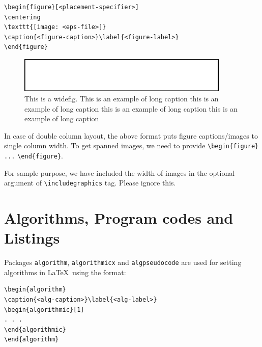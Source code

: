 \documentclass[sn-mathphys]{sn-jnl}%
\theoremstyle{thmstyleone}%
\theoremstyle{thmstyletwo}%
\theoremstyle{thmstylethree}%
\begin{document}
\bigskip
\begin{verbatim}
\begin{figure}[<placement-specifier>]
\centering
\texttt{[image: <eps-file>]}
\caption{<figure-caption>}\label{<figure-label>}
\end{figure}
\end{verbatim}
\bigskip

\begin{figure}[h]%
\centering
\includegraphics[width=0.9\textwidth]{fig.eps}
\caption{This is a widefig. This is an example of long caption this is an example of long caption  this is an example of long caption this is an example of long caption}\label{fig1}
\end{figure}

In case of double column layout, the above format puts figure captions/images to single column width. To get spanned images, we need to provide \verb+\begin{figure}+ \verb+...+ \verb+\end{figure}+.

For sample purpose, we have included the width of images in the optional argument of \verb+\includegraphics+ tag. Please ignore this. 

\section{Algorithms, Program codes and Listings}\label{sec7}

Packages \verb+algorithm+, \verb+algorithmicx+ and \verb+algpseudocode+ are used for setting algorithms in \LaTeX\ using the format:

\bigskip
\begin{verbatim}
\begin{algorithm}
\caption{<alg-caption>}\label{<alg-label>}
\begin{algorithmic}[1]
. . .
\end{algorithmic}
\end{algorithm}
\end{verbatim}
\bigskip
\end{document}
